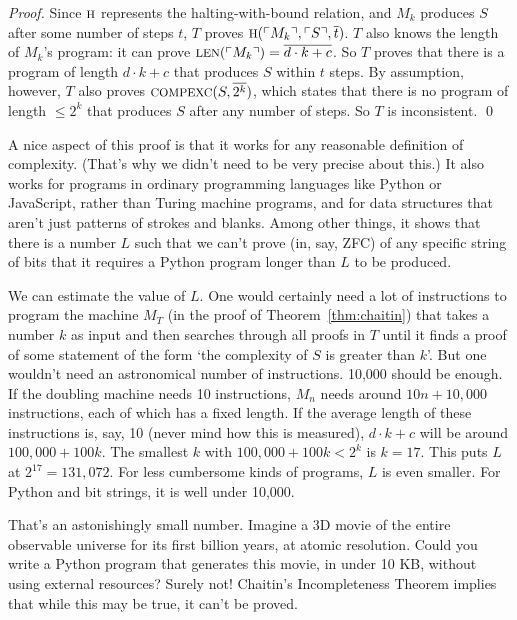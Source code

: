 \begin{proof}
  Since $\smallcaps{H}$ represents the halting-with-bound relation,
  and $M_k$ produces $S$ after some number of steps $t$,
  $T$ proves $\smallcaps{H}(\gn{M_k}, \gn{S}, \num{t})$.
  $T$ also knows the length of $M_k$'s program:
  it can prove $\smallcaps{len}(\gn{M_k}) = \num{d \cdot k + c}$.
  So $T$ proves that there is a program of length $d \cdot k + c$ that produces $S$ within $t$ steps.
  By assumption,
  however,
  $T$ also proves $\smallcaps{CompExc}(S, \num{2^k})$,
  which states that
  there is no program of length $\leq 2^k$ that produces $S$ after any number of steps.
  So $T$ is inconsistent.
  \qed
\end{proof}

A nice aspect of this proof is that
it works for any reasonable definition of complexity.
(That's why we didn't need to be very precise about this.)
It also works for programs in ordinary programming languages like Python or JavaScript,
rather than Turing machine programs,
and for data structures that aren't just patterns of strokes and blanks.
Among other things,
it shows that there is a number $L$
such that we can't prove (in, say, ZFC) of any specific string of bits that
it requires a Python program longer than $L$ to be produced.

We can estimate the value of $L$.
One would certainly need a lot of instructions to program the machine $M_T$ (in the proof of Theorem~\ref{thm:chaitin})
that takes a number $k$ as input and
then searches through all proofs in $T$
until it finds a proof of some statement of the form
`the complexity of $S$ is greater than $k$'.
But one wouldn't need an astronomical number of instructions.
10,000 should be enough.
If the doubling machine needs 10 instructions,
$M_n$ needs around $10 n + 10,000$ instructions,
each of which has a fixed length.
If the average length of these instructions is, say, 10
(never mind how this is measured),
$d \cdot k + c$ will be around $100,000 + 100k$.
The smallest $k$ with $100,000 + 100k < 2^k$ is $k = 17$.
This puts $L$ at $2^{17} = 131,072$.
For less cumbersome kinds of programs,
$L$ is even smaller.
For Python and bit strings,
it is well under 10,000.

That's an astonishingly small number.
Imagine a 3D movie of the entire observable universe
for its first billion years,
at atomic resolution.
Could you write a Python program 
that generates this movie,
in under 10 KB,
without using external resources?
Surely not!
Chaitin's Incompleteness Theorem implies that
while this may be true,
it can't be proved.

